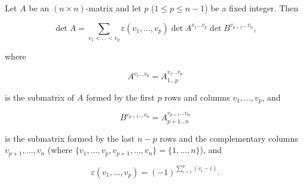 Let $A$ be an $(n \times n)$-matrix and let $p$ ($1 \leq p \leq n-1$) be a fixed integer. Then

$$\det A = \sum_{v_1 < \dots < v_p} \varepsilon(v_1, \dots, v_p) \det A^{v_1 \dots v_p} \det B^{v_{p+1} \dots v_n},$$

where

$$A^{v_1 \dots v_p} = A_{1 \dots p}^{v_1 \dots v_p}$$

is the submatrix of $A$ formed by the first $p$ rows and columns $v_1, \dots, v_p$, and

$$B^{v_{p+1} \dots v_n} = A_{p+1 \dots n}^{v_{p+1} \dots v_n}$$

is the submatrix formed by the last $n-p$ rows and the complementary columns $v_{p+1}, \dots, v_n$ (where $\{v_1, \dots, v_p, v_{p+1}, \dots, v_n\} = \{1, \dots, n\}$), and

$$\varepsilon(v_1, \dots, v_p) = (-1)^{\sum_{i=1}^{p} (v_i - i)}.$$
